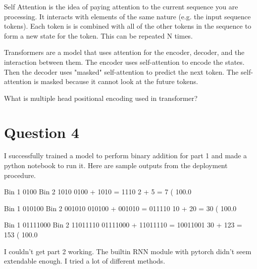 \documentclass{article}
\begin{document}
Self Attention is the idea of paying attention to the current sequence you are processing. It interacts with elements of the same nature (e.g. the input sequence tokens). Each token is is combined with all of the other tokens in the sequence to form a new state for the token. This can be repeated N times.


Transformers are a model that uses attention for the encoder, decoder, and the interaction between them. The encoder uses self-attention to encode the states. Then the decoder uses "masked" self-attention to predict the next token. The self-attention is masked because it cannot look at the future tokens.


What is multiple head positional encoding used in transformer?



\section{Question 4}


I successfully trained a model to perform binary addition for part 1 and made a python notebook to run it. Here are sample outputs from the deployment procedure.

\begin{verbatim*}
Bin 1 0100 Bin 2 1010
0100 + 1010 = 1110
2 + 5 = 7 ( 100.0 % correct)
\end{verbatim*}

\begin{verbatim*}
Bin 1 010100 Bin 2 001010
010100 + 001010 = 011110
10 + 20 = 30 ( 100.0 % correct)
\end{verbatim*}

\begin{verbatim*}
Bin 1 01111000 Bin 2 11011110
01111000 + 11011110 = 10011001
30 + 123 = 153 ( 100.0 % correct)
\end{verbatim*}


I couldn't get part 2 working. The builtin RNN module with pytorch didn't seem extendable enough. I tried a lot of different methods.
\end{document}
